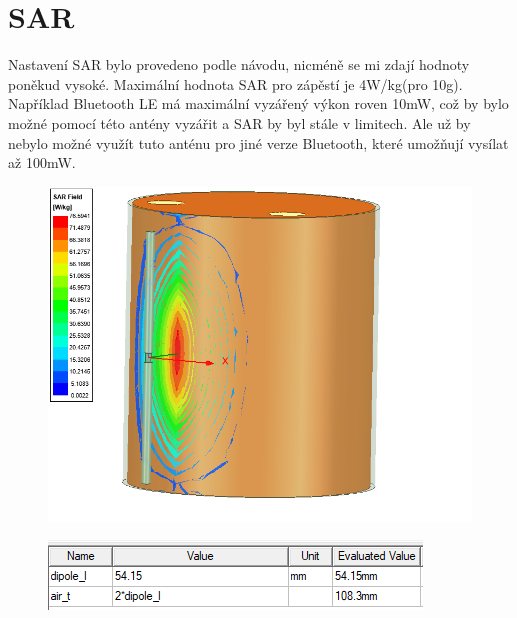 \documentclass[10pt, a4paper]{article}%
\begin{document}
\section{\Large SAR}
Nastavení SAR bylo provedeno podle návodu, nicméně se mi zdají hodnoty poněkud vysoké. Maximální hodnota
SAR pro zápěstí je 4W/kg(pro 10g). Například Bluetooth LE má maximální vyzářený výkon roven 10mW, což by
bylo možné pomocí této antény vyzářit a SAR by byl stále v limitech. Ale už by nebylo možné využít tuto
anténu pro jiné verze Bluetooth, které umožňují vysílat až 100mW.
\begin{figure}[ht!]
	\centering
	\includegraphics[width = 1\textwidth]{SAR.png}
\end{figure}

\begin{figure}[ht!]
	\centering
	\includegraphics[]{variables.png}
\end{figure}
\end{document}
